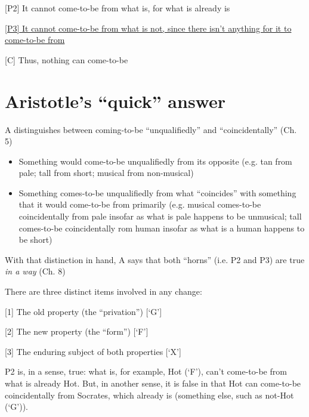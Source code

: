 \documentclass[11pt]{article}
\begin{document}
[P2] It cannot come-to-be from what is, for what is already is
\vspace*{1mm}

\underline{[P3] It cannot come-to-be from what is not, since there isn't anything for it to come-to-be from}
\vspace*{1mm}

[C] Thus, nothing can come-to-be
\vspace*{-3mm}

\section*{Aristotle's ``quick'' answer}

\noindent A distinguishes between coming-to-be ``unqualifiedly'' and ``coincidentally'' (Ch. 5)
\begin{itemize}\item{Something would come-to-be unqualifiedly from its opposite (e.g. tan from pale; tall from short; musical from non-musical)}\item{Something comes-to-be unqualifiedly from what ``coincides'' with something that it would come-to-be from primarily (e.g. musical comes-to-be coincidentally from pale insofar as what is pale happens to be unmusical; tall comes-to-be coincidentally rom human insofar as what is a human happens to be short)}\end{itemize}

\noindent With that distinction in hand, A says that both ``horns'' (i.e. P2 and P3) are true \emph{in a way} (Ch. 8)
\vspace*{2mm}

\noindent There are three distinct items involved in any change:
\vspace*{1mm}

[1] The old property (the ``privation'') [`G']
\vspace*{1mm}

[2] The new property (the ``form'') [`F']
\vspace*{1mm}

[3] The enduring subject of both properties [`X']
\vspace*{2mm}

\noindent P2 is, in a sense, true: what is, for example, Hot (`F'), can't come-to-be from what is already Hot. But, in another sense, it is false in that Hot can come-to-be coincidentally from Socrates, which already is (something else, such as not-Hot (`G')).   
\end{document}
